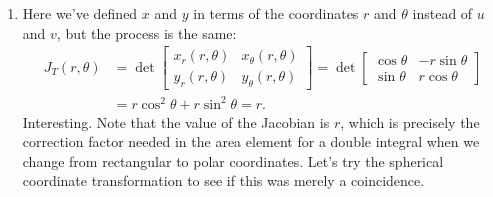 {
\begin{enumerate}
\item Here we've defined $x$ and $y$ in terms of the coordinates $r$ and $\theta$ instead of $u$ and $v$, but the process is the same:
\begin{align*}
J_T(r,\theta) &= \det\begin{bmatrix}x_r(r,\theta) & x_\theta(r,\theta)\\
y_r(r,\theta) & y_\theta(r,\theta)\end{bmatrix} = \det\begin{bmatrix}
\cos\theta & -r\sin\theta\\ \sin\theta & r\cos\theta\end{bmatrix}\\
& = r\cos^2\theta+r\sin^2\theta = r.
\end{align*}
Interesting. Note that the value of the Jacobian is $r$, which is precisely the correction factor needed in the area element for a double integral when we change from rectangular to polar coordinates. Let's try the spherical coordinate transformation to see if this was merely a coincidence.


\end{enumerate}}
